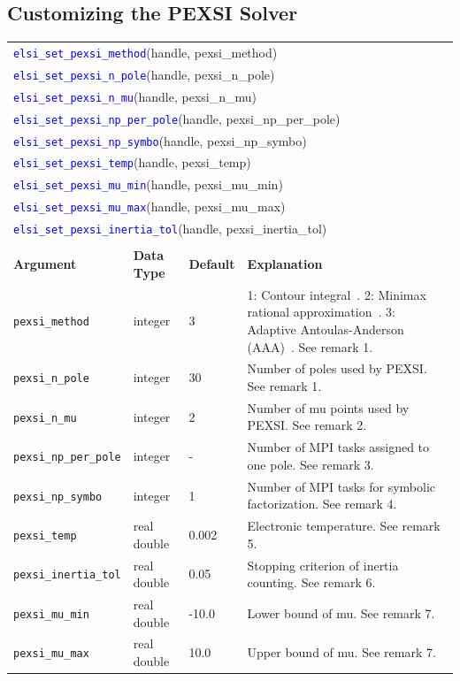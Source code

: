 \documentclass{report}
\newcommand{\api}[1]{\textcolor{blue}{\texttt{#1}}}
\begin{document}
\subsection{Customizing the PEXSI Solver}
\label{subsec:setter_pexsi}
\begin{tabular}[]{|p{30mm}|p{20mm}|p{15mm}|p{97mm}|}
\multicolumn{4}{l}{\api{elsi\_set\_pexsi\_method}(handle, pexsi\_method)}\\
\multicolumn{4}{l}{\api{elsi\_set\_pexsi\_n\_pole}(handle, pexsi\_n\_pole)}\\
\multicolumn{4}{l}{\api{elsi\_set\_pexsi\_n\_mu}(handle, pexsi\_n\_mu)}\\
\multicolumn{4}{l}{\api{elsi\_set\_pexsi\_np\_per\_pole}(handle, pexsi\_np\_per\_pole)}\\
\multicolumn{4}{l}{\api{elsi\_set\_pexsi\_np\_symbo}(handle, pexsi\_np\_symbo)}\\
\multicolumn{4}{l}{\api{elsi\_set\_pexsi\_temp}(handle, pexsi\_temp)}\\
\multicolumn{4}{l}{\api{elsi\_set\_pexsi\_mu\_min}(handle, pexsi\_mu\_min)}\\
\multicolumn{4}{l}{\api{elsi\_set\_pexsi\_mu\_max}(handle, pexsi\_mu\_max)}\\
\multicolumn{4}{l}{\api{elsi\_set\_pexsi\_inertia\_tol}(handle, pexsi\_inertia\_tol)}\\
\multicolumn{4}{l}{}\\
\hline
\multicolumn{1}{|l|}{\textbf{Argument}} & \multicolumn{1}{l|}{\textbf{Data Type}} & \multicolumn{1}{l|}{\textbf{Default}} & \multicolumn{1}{l|}{\textbf{Explanation}}\\
\hline
\texttt{pexsi\_method}        & integer     & 3     & 1: Contour integral~\cite{pexsi_lin_2013}. 2: Minimax rational approximation~\cite{pole_moussa_2016}. 3: Adaptive Antoulas-Anderson (AAA)~\cite{aaa_nakatsukasa_2018}. See remark 1.\\
\hline
\texttt{pexsi\_n\_pole}       & integer     & 30    & Number of poles used by PEXSI. See remark 1.\\
\hline
\texttt{pexsi\_n\_mu}         & integer     & 2     & Number of mu points used by PEXSI. See remark 2.\\
\hline
\texttt{pexsi\_np\_per\_pole} & integer     & -     & Number of MPI tasks assigned to one pole. See remark 3.\\
\hline
\texttt{pexsi\_np\_symbo}     & integer     & 1     & Number of MPI tasks for symbolic factorization. See remark 4.\\
\hline
\texttt{pexsi\_temp}          & real double & 0.002 & Electronic temperature. See remark 5.\\
\hline
\texttt{pexsi\_inertia\_tol}  & real double & 0.05  & Stopping criterion of inertia counting. See remark 6.\\
\hline
\texttt{pexsi\_mu\_min}       & real double & -10.0 & Lower bound of mu. See remark 7.\\
\hline
\texttt{pexsi\_mu\_max}       & real double & 10.0  & Upper bound of mu. See remark 7.\\
\hline
\end{tabular}
\end{document}
